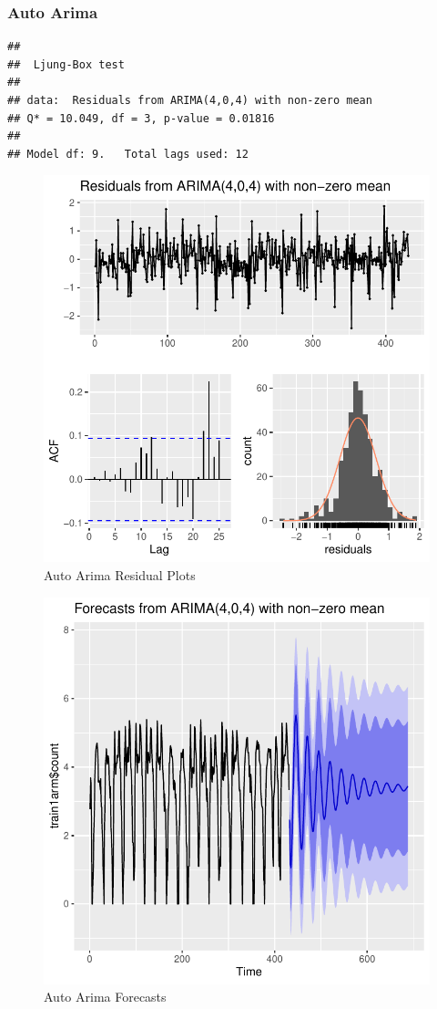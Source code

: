 \documentclass[american,]{article}
\begin{document}
\hypertarget{auto-arima}{%
\subsubsection{Auto Arima}\label{auto-arima}}

\begin{verbatim}
## 
##  Ljung-Box test
## 
## data:  Residuals from ARIMA(4,0,4) with non-zero mean
## Q* = 10.049, df = 3, p-value = 0.01816
## 
## Model df: 9.   Total lags used: 12
\end{verbatim}

\begin{figure}[htbp]

{\centering \includegraphics[width=0.45\linewidth]{BikeSharingDemand_files/figure-latex/auto-arima-plot-1-1} 

}

\caption{Auto Arima Residual Plots}\label{fig:auto-arima-plot-1}
\end{figure}

\begin{figure}[htbp]

{\centering \includegraphics[width=0.45\linewidth]{BikeSharingDemand_files/figure-latex/auto-arima-plot-2-1} 

}

\caption{Auto Arima Forecasts}\label{fig:auto-arima-plot-2}
\end{figure}
\end{document}
